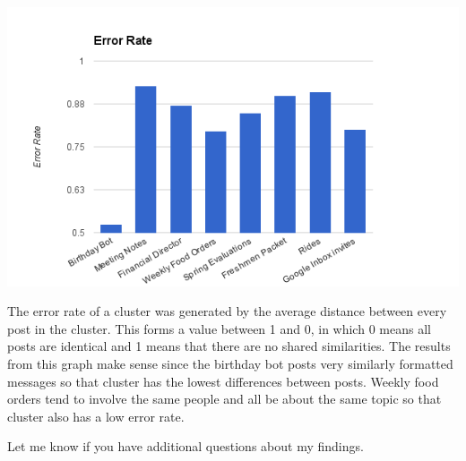 \documentclass[9pt]{extarticle} %
\begin{document}
\begin{multicols}{2}
\vfill
\columnbreak

\centerline{\includegraphics[width=\linewidth]{imgs/2016-02-15-error.png}}

The error rate of a cluster was generated by the average distance between every post in the cluster. This forms a value between 1 and 0, in which 0 means all posts are identical and 1 means that there are no shared similarities. The results from this graph make sense since the birthday bot posts very similarly formatted messages so that cluster has the lowest differences between posts. Weekly food orders tend to involve the same people and all be about the same topic so that cluster also has a low error rate. 



Let me know if you have additional questions about my findings. 

\end{multicols}
\end{document}
